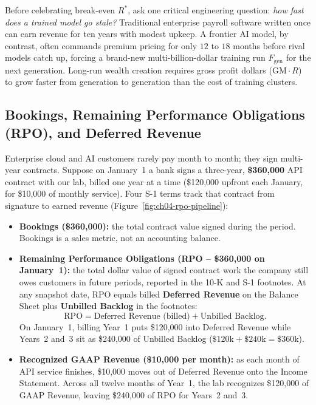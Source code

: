 \begin{intuitionbox}
Before celebrating break-even $R^*$, ask one critical engineering question: \emph{how fast does a trained model go stale?} Traditional enterprise payroll software written once can earn revenue for ten years with modest upkeep. A frontier AI model, by contrast, often commands premium pricing for only $12$ to $18$ months before rival models catch up, forcing a brand-new multi-billion-dollar training run $F_{\text{gen}}$ for the next generation. Long-run wealth creation requires gross profit dollars ($\text{GM} \cdot R$) to grow faster from generation to generation than the cost of training clusters.
\end{intuitionbox}

\subsection{Bookings, Remaining Performance Obligations (RPO), and Deferred Revenue}

Enterprise cloud and AI customers rarely pay month to month; they sign multi-year contracts. Suppose on January~1 a bank signs a three-year, \textbf{\$360,000} API contract with our lab, billed one year at a time (\$120,000 upfront each January, for \$10,000 of monthly service). Four S-1 terms track that contract from signature to earned revenue (Figure~\ref{fig:ch04-rpo-pipeline}):
\begin{itemize}
  \item \textbf{Bookings (\$360,000):} the total contract value signed during the period. Bookings is a sales metric, not an accounting balance.
  \item \textbf{Remaining Performance Obligations (RPO -- \$360,000 on January~1):} the total dollar value of signed contract work the company still owes customers in future periods, reported in the 10-K and S-1 footnotes. At any snapshot date, RPO equals billed \textbf{Deferred Revenue} on the Balance Sheet plus \textbf{Unbilled Backlog} in the footnotes:
  \[
    \text{RPO} = \text{Deferred Revenue (billed)} + \text{Unbilled Backlog}.
  \]
  On January~1, billing Year~1 puts \$120,000 into Deferred Revenue while Years~2 and~3 sit as \$240,000 of Unbilled Backlog ($\$120\text{k} + \$240\text{k} = \$360\text{k}$).
  \item \textbf{Recognized GAAP Revenue (\$10,000 per month):} as each month of API service finishes, \$10,000 moves out of Deferred Revenue onto the Income Statement. Across all twelve months of Year~1, the lab recognizes \$120,000 of GAAP Revenue, leaving \$240,000 of RPO for Years~2 and~3.
\end{itemize}

